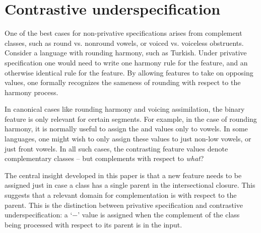\documentclass[11pt, oneside]{article}   	%
\begin{document}
\FloatBarrier
\section{Contrastive underspecification}
\label{sec:contrastiveunder}

One of the best cases for non-privative specifications arises from complement classes, such as round vs. nonround vowels, or voiced vs. voiceless obstruents. Consider a language with rounding harmony, such as Turkish. Under privative specification one would need to write one harmony rule for the  feature, and an otherwise identical rule for the  feature. By allowing features to take on opposing values, one formally recognizes the sameness of rounding with respect to the harmony process.

In canonical cases like rounding harmony and voicing assimilation, the binary feature is only relevant for certain segments. For example, in the case of rounding harmony, it is normally useful to assign the  and  values only to vowels. In some languages, one might wish to only assign these values to just non-low vowels, or just front vowels. In all such cases, the contrasting feature values denote complementary classes -- but complements with respect to \textit{what}?

The central insight developed in this paper is that a new feature needs to be assigned just in case a class has a single parent in the intersectional closure. This suggests that a relevant domain for complementation is with respect to the parent. This is the distinction between privative specification and contrastive underspecification: a `$-$' value is assigned when the complement of the class being processed with respect to its parent is in the input.
\end{document}
